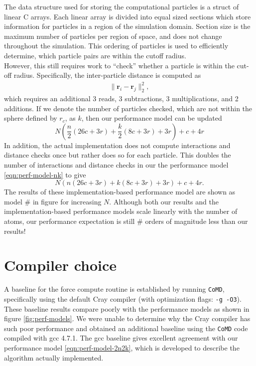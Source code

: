 \documentclass[12pt]{article}
\begin{document}
\noindent The data structure used for storing the computational particles is a
struct of linear C arrays. Each linear array is divided into equal sized sections which 
store information for particles in a region of the simulation domain. 
Section size is the maximum number of particles per region of space, 
and does not change throughout the simulation. 
This ordering of particles is used to efficiently determine, which particle pairs are within 
the cutoff radius. \\

\noindent However, this still requires work to ``check'' whether a particle 
is within the cut-off radius. Specifically, the inter-particle distance is computed as
\begin{align*}
    \| \bm{r}_i - \bm{r}_j\|_2^2,
\end{align*}
which requires an additional 3 reads, 3 subtractions, 3 multiplications, and 2 additions.
If we denote the number of particles checked, which are not within the sphere defined 
by $r_c$, as $k$, then our performance model can be updated
\begin{equation}
  N \left(\frac{n}{2} \left(26 c + 3 r\right)+\frac{k}{2} \left(8 c + 3 r\right) + 3 r\right) + c + 4 r
  \label{eqn:perf-model-nk}
\end{equation}
In addition, the actual implementation does not compute interactions and distance
checks once but rather does so for each particle. This doubles the number of interactions 
and distance checks in our the performance model \ref{eqn:perf-model-nk} to give
\begin{equation}
  N \left(n \left(26 c + 3 r\right)+k \left(8 c + 3 r\right) + 3 r\right) + c + 4 r.
  \label{eqn:perf-model-2n2k}
\end{equation}
The results of these implementation-based performance model are shown as model \# in figure 
for increasing $N$. Although both our results and the implementation-based performance models 
scale linearly with the number of atoms, our performance expectation is still \# orders of magnitude 
less than our results!


\section{Compiler choice}
A baseline for the force compute routine is established by running \texttt{CoMD}, 
specifically using the default Cray compiler (with optimization flags: \texttt{-g -O3}).
These baseline results compare poorly with the performance models 
as shown in figure \ref{fig:perf-models}. We were unable to determine why the Cray
compiler has such poor performance and obtained an additional baseline using
the \texttt{CoMD} code compiled with gcc 4.7.1. The gcc baseline gives excellent
agreement with our performance model \ref{eqn:perf-model-2n2k}, which
is developed to describe the algorithm actually implemented.
\end{document}

